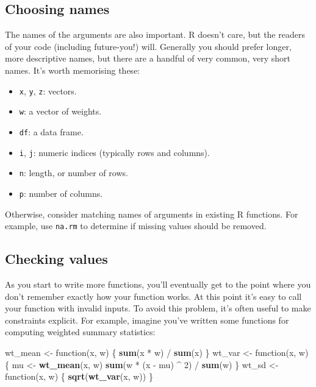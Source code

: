 \documentclass[]{book}
\newenvironment{Shaded}{\begin{snugshade}}{\end{snugshade}}
\newcommand{\KeywordTok}[1]{\textcolor[rgb]{0.13,0.29,0.53}{\textbf{{#1}}}}
\newcommand{\DecValTok}[1]{\textcolor[rgb]{0.00,0.00,0.81}{{#1}}}
\newcommand{\StringTok}[1]{\textcolor[rgb]{0.31,0.60,0.02}{{#1}}}
\newcommand{\NormalTok}[1]{{#1}}
\providecommand{\tightlist}{%
  \setlength{\itemsep}{0pt}\setlength{\parskip}{0pt}}
\begin{document}
\subsection{Choosing names}\label{choosing-names}

The names of the arguments are also important. R doesn't care, but the
readers of your code (including future-you!) will. Generally you should
prefer longer, more descriptive names, but there are a handful of very
common, very short names. It's worth memorising these:

\begin{itemize}
\tightlist
\item
  \texttt{x}, \texttt{y}, \texttt{z}: vectors.
\item
  \texttt{w}: a vector of weights.
\item
  \texttt{df}: a data frame.
\item
  \texttt{i}, \texttt{j}: numeric indices (typically rows and columns).
\item
  \texttt{n}: length, or number of rows.
\item
  \texttt{p}: number of columns.
\end{itemize}

Otherwise, consider matching names of arguments in existing R functions.
For example, use \texttt{na.rm} to determine if missing values should be
removed.

\subsection{Checking values}\label{checking-values}

As you start to write more functions, you'll eventually get to the point
where you don't remember exactly how your function works. At this point
it's easy to call your function with invalid inputs. To avoid this
problem, it's often useful to make constraints explicit. For example,
imagine you've written some functions for computing weighted summary
statistics:

\begin{Shaded}
\begin{Highlighting}[]
\NormalTok{wt_mean <-}\StringTok{ }\NormalTok{function(x, w) \{}
  \KeywordTok{sum}\NormalTok{(x *}\StringTok{ }\NormalTok{w) /}\StringTok{ }\KeywordTok{sum}\NormalTok{(x)}
\NormalTok{\}}
\NormalTok{wt_var <-}\StringTok{ }\NormalTok{function(x, w) \{}
  \NormalTok{mu <-}\StringTok{ }\KeywordTok{wt_mean}\NormalTok{(x, w)}
  \KeywordTok{sum}\NormalTok{(w *}\StringTok{ }\NormalTok{(x -}\StringTok{ }\NormalTok{mu) ^}\StringTok{ }\DecValTok{2}\NormalTok{) /}\StringTok{ }\KeywordTok{sum}\NormalTok{(w)}
\NormalTok{\}}
\NormalTok{wt_sd <-}\StringTok{ }\NormalTok{function(x, w) \{}
  \KeywordTok{sqrt}\NormalTok{(}\KeywordTok{wt_var}\NormalTok{(x, w))}
\NormalTok{\}}
\end{Highlighting}
\end{Shaded}
\end{document}
